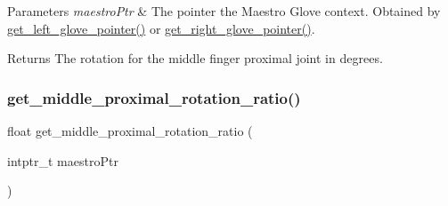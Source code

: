 \begin{DoxyParams}{Parameters}
{\em maestro\+Ptr} & The pointer the Maestro Glove context. Obtained by \hyperlink{group__glove_management_ga63ce3c99d4a8b8db851b22af9185764e}{get\+\_\+left\+\_\+glove\+\_\+pointer()} or \hyperlink{group__glove_management_ga9b8fd9d91aeac3f8da50f7a7eba0c32b}{get\+\_\+right\+\_\+glove\+\_\+pointer()}. \\
\hline
\end{DoxyParams}
\begin{DoxyReturn}{Returns}
The rotation for the middle finger proximal joint in degrees. 
\end{DoxyReturn}
\mbox{\label{group__rotation_access_gaf8bed7222cb6414313c279237f4233d7}} 
\subsubsection{\texorpdfstring{get\+\_\+middle\+\_\+proximal\+\_\+rotation\+\_\+ratio()}{get\_middle\_proximal\_rotation\_ratio()}}
{\footnotesize\ttfamily float get\+\_\+middle\+\_\+proximal\+\_\+rotation\+\_\+ratio (\begin{DoxyParamCaption}\item[{intptr\+\_\+t}]{maestro\+Ptr }\end{DoxyParamCaption})}


